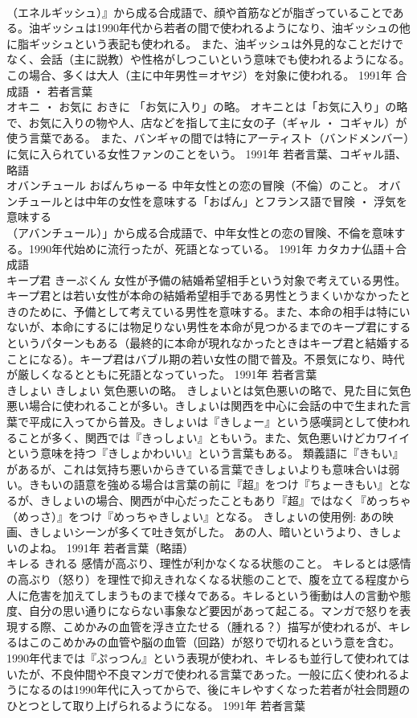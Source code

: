 \documentclass[8pt]{extreport}
\begin{document}
\begin{CJK}{UTF8}{min}
\\	（エネルギッシュ）』から成る合成語で、顔や首筋などが脂ぎっていることである。油ギッシュは1990年代から若者の間で使われるようになり、油ギッシュの他に脂ギッシュという表記も使われる。 また、油ギッシュは外見的なことだけでなく、会話（主に説教）や性格がしつこいという意味でも使われるようになる。この場合、多くは大人（主に中年男性＝オヤジ）を対象に使われる。	1991年	合成語 ・ 若者言葉	
\\	オキニ ・ お気に	おきに	「お気に入り」の略。	オキニとは「お気に入り」の略で、お気に入りの物や人、店などを指して主に女の子（ギャル ・ コギャル）が使う言葉である。 また、バンギャの間では特にアーティスト（バンドメンバー）に気に入られている女性ファンのことをいう。	1991年	若者言葉、コギャル語、略語	
\\	オバンチュール	おばんちゅーる	中年女性との恋の冒険（不倫）のこと。	オバンチュールとは中年の女性を意味する「おばん」とフランス語で冒険 ・ 浮気を意味する
\\	（アバンチュール）」から成る合成語で、中年女性との恋の冒険、不倫を意味する。1990年代始めに流行ったが、死語となっている。	1991年	カタカナ仏語＋合成語	
\\	キープ君	きーぷくん	女性が予備の結婚希望相手という対象で考えている男性。	キープ君とは若い女性が本命の結婚希望相手である男性とうまくいかなかったときのために、予備として考えている男性を意味する。また、本命の相手は特にいないが、本命にするには物足りない男性を本命が見つかるまでのキープ君にするというパターンもある（最終的に本命が現れなかったときはキープ君と結婚することになる）。キープ君はバブル期の若い女性の間で普及。不景気になり、時代が厳しくなるとともに死語となっていった。	1991年	若者言葉	
\\	きしょい	きしょい	気色悪いの略。	きしょいとは気色悪いの略で、見た目に気色悪い場合に使われることが多い。きしょいは関西を中心に会話の中で生まれた言葉で平成に入ってから普及。きしょいは『きしょー』という感嘆詞として使われることが多く、関西では『きっしょい』ともいう。また、気色悪いけどカワイイという意味を持つ『きしょかわいい』という言葉もある。 類義語に『きもい』があるが、これは気持ち悪いからきている言葉できしょいよりも意味合いは弱い。きもいの語意を強める場合は言葉の前に『超』をつけ『ちょーきもい』となるが、きしょいの場合、関西が中心だったこともあり『超』ではなく『めっちゃ（めっさ）』をつけ『めっちゃきしょい』となる。 きしょいの使用例: あの映画、きしょいシーンが多くて吐き気がした。 あの人、暗いというより、きしょいのよね。	1991年	若者言葉（略語）	
\\	キレる	きれる	感情が高ぶり、理性が利かなくなる状態のこと。	キレるとは感情の高ぶり（怒り）を理性で抑えきれなくなる状態のことで、腹を立てる程度から人に危害を加えてしまうものまで様々である。キレるという衝動は人の言動や態度、自分の思い通りにならない事象など要因があって起こる。マンガで怒りを表現する際、こめかみの血管を浮き立たせる（腫れる？）描写が使われるが、キレるはこのこめかみの血管や脳の血管（回路）が怒りで切れるという意を含む。1990年代までは『ぷっつん』という表現が使われ、キレるも並行して使われてはいたが、不良仲間や不良マンガで使われる言葉であった。一般に広く使われるようになるのは1990年代に入ってからで、後にキレやすくなった若者が社会問題のひとつとして取り上げられるようになる。	1991年	若者言葉	

\end{CJK}
\end{document}
